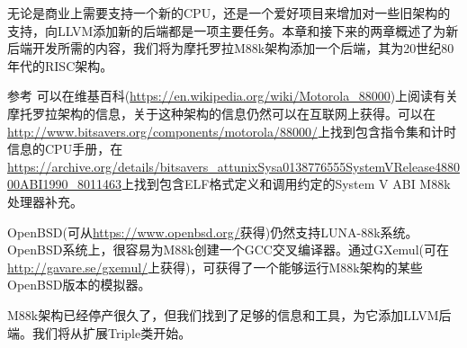 无论是商业上需要支持一个新的CPU，还是一个爱好项目来增加对一些旧架构的支持，向LLVM添加新的后端都是一项主要任务。本章和接下来的两章概述了为新后端开发所需的内容，我们将为摩托罗拉M88k架构添加一个后端，其为20世纪80年代的RISC架构。

\begin{myTip}{参考}
可以在维基百科(\url{https://en.wikipedia.org/wiki/Motorola_88000})上阅读有关摩托罗拉架构的信息，关于这种架构的信息仍然可以在互联网上获得。可以在\url{http://www.bitsavers.org/components/motorola/88000/}上找到包含指令集和计时信息的CPU手册，在\url{https://archive.org/details/bitsavers_attunixSysa0138776555SystemVRelease488000ABI1990_8011463}上找到包含ELF格式定义和调用约定的System V ABI M88k处理器补充。

OpenBSD(可从\url{https://www.openbsd.org/}获得)仍然支持LUNA-88k系统。OpenBSD系统上，很容易为M88k创建一个GCC交叉编译器。通过GXemul(可在\url{http://gavare.se/gxemul/}上获得)，可获得了一个能够运行M88k架构的某些OpenBSD版本的模拟器。
\end{myTip}

M88k架构已经停产很久了，但我们找到了足够的信息和工具，为它添加LLVM后端。我们将从扩展Triple类开始。











